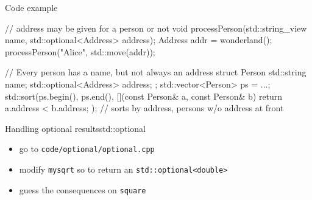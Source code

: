 \begin{frame}[fragile]
  \begin{exampleblock}{Code example}
    \small
    \begin{cppcode*}{}
      // address may be given for a person or not
      void processPerson(std::string_view name,
                         std::optional<Address> address);
      Address addr = wonderland();
      processPerson("Alice", std::move(addr));

      // Every person has a name, but not always an address
      struct Person {
        std::string name;
        std::optional<Address> address;
      };
      std::vector<Person> ps = ...;
      std::sort(ps.begin(), ps.end(),
                [](const Person& a, const Person& b) {
        return a.address < b.address;
      }); // sorts by address, persons w/o address at front
    \end{cppcode*}
  \end{exampleblock}
\end{frame}

\begin{frame}[fragile]
  \begin{exerciseWithShortcut}{Handling optional results}{std::optional}
    \begin{itemize}
      \item go to \texttt{code/optional/optional.cpp}
      \item modify \texttt{mysqrt} so to return an \texttt{std::optional<double>}
      \item guess the consequences on \texttt{square}
    \end{itemize}
  \end{exerciseWithShortcut}
\end{frame}

